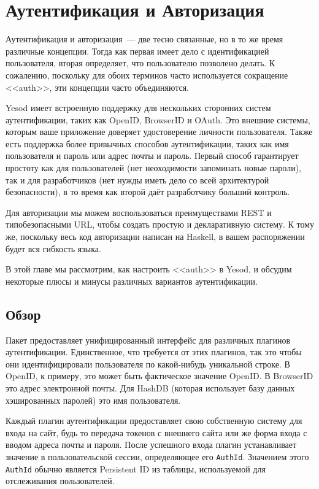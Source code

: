 \chapter{Аутентификация и Авторизация}\label{chap:auth}

Аутентификация и авторизация~--- две тесно связанные, но в то же время различные концепции. Тогда как первая имеет дело с идентификацией пользователя, вторая определяет, что пользователю позволено делать. К сожалению, поскольку для обоих терминов часто используется сокращение <<auth>>, эти концепции часто объединяются.

Yesod имеет встроенную поддержку для нескольких сторонних систем аутентификации, таких как OpenID, BrowserID и OAuth. Это внешние системы, которым ваше приложение доверяет удостоверение личности пользователя. Также есть поддержка более привычных способов аутентификации, таких как имя пользователя и пароль или адрес почты и пароль. Первый способ гарантирует простоту как для пользователей (нет неоходимости запоминать новые пароли), так и для разработчиков (нет нужды иметь дело со всей архитектурой безопасности), в то время как второй даёт разработчику больший контроль.

Для авторизации мы можем воспользоваться преимуществами REST и типобезопасными URL, чтобы создать простую и декларативную систему. К тому же, поскольку весь код авторизации написан на Haskell, в вашем распоряжении будет вся гибкость языка.

В этой главе мы рассмотрим, как настроить <<auth>> в Yesod, и обсудим некоторые плюсы и минусы различных вариантов аутентификации.

\section{Обзор}


Пакет  предоставляет унифицированный интерфейс для различных плагинов аутентификации. Единственное, что требуется от этих плагинов, так это чтобы они идентифицировали пользователя по какой-нибудь уникальной строке. В OpenID, к примеру, это может быть фактическое значение OpenID. В BrowserID это адрес электронной почты. Для HashDB (которая использует базу данных хэшированных паролей) это имя пользователя.

Каждый плагин аутентификации предоставляет свою собственную систему для входа на сайт, будь то передача токенов с внешнего сайта или же форма входа с вводом адреса почты и пароля. После успешного входа плагин устанавливает значение в пользовательской сессии, определяющее его \lstinline'AuthId'. Значением этого \lstinline'AuthId' обычно является Persistent ID из таблицы, используемой для отслеживания пользователей. 

